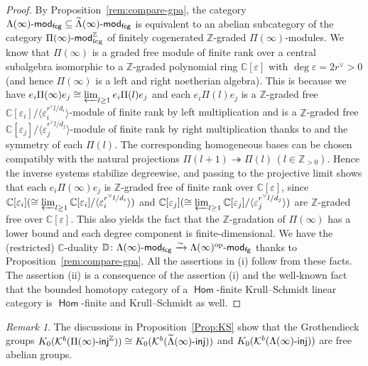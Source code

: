 \documentclass[12pt]{amsart}
\theoremstyle{definition}
\theoremstyle{remark}
\newtheorem{remark}[theorem]{Remark}
\numberwithin{equation}{section}
\newcommand{\opname}[1]{\operatorname{\mathsf{#1}}}
\newcommand{\Hom}{\opname{Hom}}
\newcommand{\injc}{\mathchar`-\mathsf{inj}}
\newcommand{\modfcg}{\mathchar`-\mathsf{mod}_{\mathrm{fcg}}}
\begin{document}
\begin{proof}
By Proposition~\ref{rem:compare-gpa}, the category $\Lambda(\infty)\mathchar`-\mathsf{mod}_\mathsf{fcg}\subseteq \widetilde\Lambda(\infty)\mathchar`-\mathsf{mod}_\mathsf{fcg}$ is equivalent to an abelian subcategory of the category $\Pi(\infty)\modfcg^{\mathbb{Z}}$ of finitely cogenerated $\mathbb{Z}$-graded $\Pi(\infty)$-modules. We know that $\Pi(\infty)$ is a graded free module of finite rank over a central subalgebra isomorphic to a $\mathbb{Z}$-graded polynomial ring $\mathbb{C}[\varepsilon]$ with $\deg \varepsilon = 2r^\vee> 0$ (and hence $\Pi(\infty)$ is a left and right noetherian algebra). This is because we have $e_i\Pi(\infty)e_j\cong \varprojlim_{l\geq 1} e_i\Pi(l)e_j$ and each $e_i\Pi(l)e_j$ is a $\mathbb{Z}$-graded free $\mathbb{C}[\varepsilon_i]/\langle \varepsilon_i^{r^\vee l/d_i} \rangle$-module of finite rank by left multiplication and is a $\mathbb{Z}$-graded free $\mathbb{C}[\varepsilon_j]/\langle \varepsilon_j^{r^\vee l/d_j} \rangle$-module of finite rank by right multiplication thanks to \cite[Theorem~11.12]{GLS-2017} and the symmetry of each $\Pi(l)$. 
The corresponding homogeneous bases can be chosen compatibly
with the natural projections $\Pi(l+1)\twoheadrightarrow\Pi(l)\,(l\in \mathbb{Z}_{>0})$.
Hence the inverse systems stabilize degreewise, and passing to the
projective limit shows that each $e_i\Pi(\infty)e_j$ is $\mathbb{Z}$-graded free of
finite rank over $\mathbb C[\varepsilon]$, since $\mathbb{C}[\varepsilon_i](\cong \varprojlim_{l\geq 1} \mathbb{C}[\varepsilon_i]/\langle \varepsilon_i^{r^\vee l/d_i} \rangle)$ and $\mathbb{C}[\varepsilon_j](\cong \varprojlim_{l\geq 1} \mathbb{C}[\varepsilon_j]/\langle \varepsilon_j^{r^\vee l/d_j} \rangle)$ are $\mathbb{Z}$-graded free over $\mathbb{C}[\varepsilon]$. This also yields the fact that the $\mathbb Z$-gradation of $\Pi(\infty)$ has a lower bound and each degree component is finite-dimensional. We have the (restricted) $\mathbb{C}$-duality $\mathbb{D}\colon \Lambda(\infty)\mathchar`-\mathsf{mod}_\mathsf{fcg} \xrightarrow{\sim} \Lambda(\infty)^{\text{op}}\mathchar`-\mathsf{mod}_\mathsf{fg}$ thanks to Proposition~\ref{rem:compare-gpa}. All the assertions in (i) follow from these facts.
The assertion (ii) is a consequence of the assertion (i) and the well-known fact that the bounded homotopy category of a $\Hom$-finite Krull--Schmidt linear category is $\Hom$-finite and Krull--Schmidt as well.
\end{proof}
\begin{remark}
    The discussions in Proposition~\ref{Prop:KS} show that the Grothendieck groups $K_0(\mathcal{K}^b(\Pi(\infty)\injc^\mathbb{Z}))\cong K_0(\mathcal{K}^b(\widetilde{\Lambda}(\infty)\injc))$ and $K_0(\mathcal{K}^b(\Lambda(\infty)\injc))$ are free abelian groups.
\end{remark}
\end{document}
